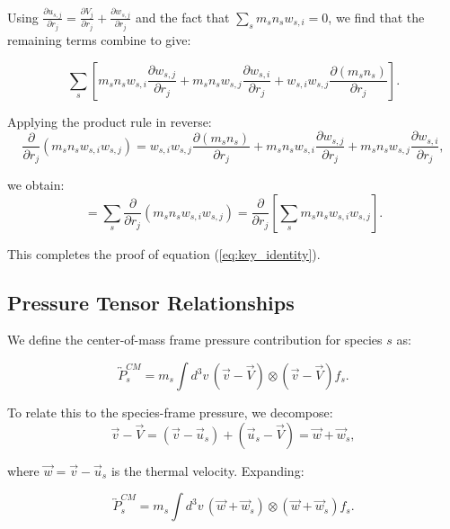 Using $\frac{\partial u_{s,j}}{\partial r_j} = \frac{\partial V_j}{\partial r_j} + \frac{\partial w_{s,j}}{\partial r_j}$ and the fact that $\sum_s m_s n_s w_{s,i} = 0$, we find that the remaining terms combine to give:

\begin{equation*}
\sum_s \left[m_s n_s w_{s,i} \frac{\partial w_{s,j}}{\partial r_j} + m_s n_s w_{s,j} \frac{\partial w_{s,i}}{\partial r_j} + w_{s,i} w_{s,j} \frac{\partial (m_s n_s)}{\partial r_j}\right].
\end{equation*}

Applying the product rule in reverse:
\begin{equation*}
\frac{\partial}{\partial r_j}(m_s n_s w_{s,i} w_{s,j}) = w_{s,i} w_{s,j} \frac{\partial (m_s n_s)}{\partial r_j} + m_s n_s w_{s,i} \frac{\partial w_{s,j}}{\partial r_j} + m_s n_s w_{s,j} \frac{\partial w_{s,i}}{\partial r_j},
\end{equation*}

we obtain:
\begin{equation*}
= \sum_s \frac{\partial}{\partial r_j}(m_s n_s w_{s,i} w_{s,j}) = \frac{\partial}{\partial r_j}\left[\sum_s m_s n_s w_{s,i} w_{s,j}\right].
\end{equation*}

This completes the proof of equation (\ref{eq:key_identity}).

\subsection*{Pressure Tensor Relationships}

We define the center-of-mass frame pressure contribution for species $s$ as:

\begin{equation*}
\overleftrightarrow{P}_s^{CM} = m_s \int d^3v \, (\vec{v} - \vec{V}) \otimes (\vec{v} - \vec{V}) f_s.
\end{equation*}

To relate this to the species-frame pressure, we decompose:
\begin{equation*}
\vec{v} - \vec{V} = (\vec{v} - \vec{u}_s) + (\vec{u}_s - \vec{V}) = \vec{w} + \vec{w}_s,
\end{equation*}

where $\vec{w} = \vec{v} - \vec{u}_s$ is the thermal velocity. Expanding:

\begin{equation*}
\overleftrightarrow{P}_s^{CM} = m_s \int d^3v \, (\vec{w} + \vec{w}_s) \otimes (\vec{w} + \vec{w}_s) f_s.
\end{equation*}

